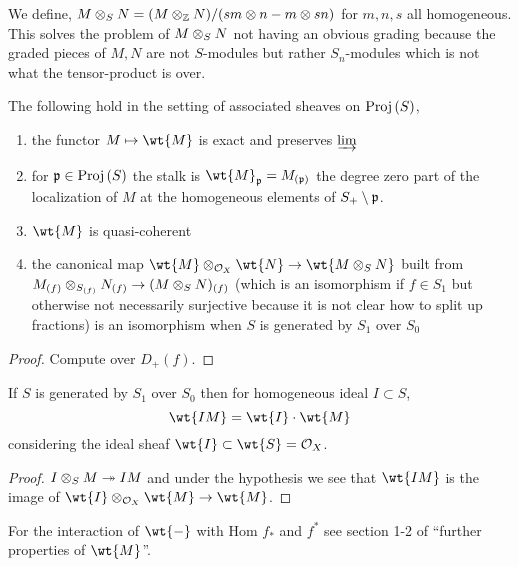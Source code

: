 \documentclass[12pt]{article}
\begin{document}
\begin{rmk}
We define, $M \otimes_S N = (M \otimes_{\mathbb{Z}} N) / (s m \otimes n - m \otimes sn)$ for $m,n,s$ all homogeneous. This solves the problem of $M \otimes_S N$ not having an obvious grading because the graded pieces of $M,N$ are not $S$-modules but rather $S_n$-modules which is not what the tensor-product is over. 
\end{rmk}

\begin{thm}
The following hold in the setting of associated sheaves on $\mathrm{Proj}\left( S \right)$,
\begin{enumerate}
\item the functor $M \mapsto \wt{M}$ is exact and preserves $\varinjlim$
\item for $\mathfrak{p} \in \mathrm{Proj}\left( S \right)$ the stalk is $\wt{M}_\p = M_{(\p)}$ the degree zero part of the localization of $M$ at the homogeneous elements of $S_+ \setminus \mathfrak{p}$.
\item $\wt{M}$ is quasi-coherent 
\item the canonical map $\wt{M} \ot_{\struct{X}} \wt{N} \to \wt{M \ot_S N}$ built from $M_{(f)} \otimes_{S_{(f)}} N_{(f)} \to (M \otimes_S N)_{(f)}$ (which is an isomorphism if $f \in S_1$ but otherwise not necessarily surjective because it is not clear how to split up fractions) is an isomorphism when $S$ is generated by $S_1$ over $S_0$
\end{enumerate}
\end{thm}

\begin{proof}
Compute over $D_+(f)$. 
\end{proof}

\begin{cor}
If $S$ is generated by $S_1$ over $S_0$ then for homogeneous ideal $I \subset S$,
\[ \wt{IM} = \wt{I} \cdot \wt{M} \]
considering the ideal sheaf $\wt{I} \subset \wt{S} = \struct{X}$. 
\end{cor}

\begin{proof}
$I \otimes_S M \twoheadrightarrow IM$ and under the hypothesis we see that $\wt{IM}$ is the image of $\wt{I} \ot_{\struct{X}} \wt{M} \to \wt{M}$. 
\end{proof}

\begin{rmk}
For the interaction of $\wt{-}$ with Hom $f_*$ and $f^*$ see section 1-2 of ``further properties of $\wt{M}$''. 
\end{rmk}
\end{document}
